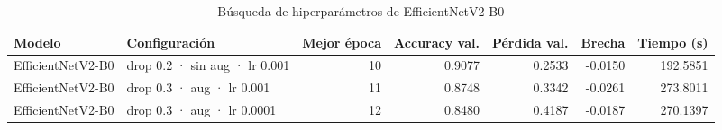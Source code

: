 \begin{table}
\caption{Búsqueda de hiperparámetros de EfficientNetV2-B0}
\label{tab:bono_busqueda}
\begin{tabular}{llrrrrr}
\toprule
Modelo & Configuración & Mejor época & Accuracy val. & Pérdida val. & Brecha & Tiempo (s) \\
\midrule
EfficientNetV2-B0 & drop 0.2 · sin aug · lr 0.001 & 10 & 0.9077 & 0.2533 & -0.0150 & 192.5851 \\
EfficientNetV2-B0 & drop 0.3 · aug · lr 0.001 & 11 & 0.8748 & 0.3342 & -0.0261 & 273.8011 \\
EfficientNetV2-B0 & drop 0.3 · aug · lr 0.0001 & 12 & 0.8480 & 0.4187 & -0.0187 & 270.1397 \\
\bottomrule
\end{tabular}
\end{table}
